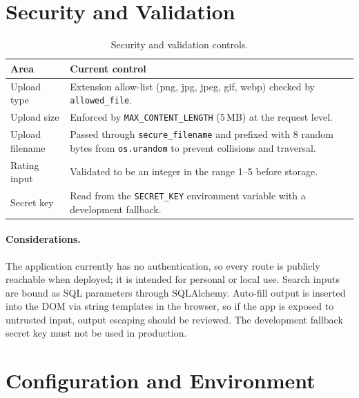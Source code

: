 \documentclass[11pt,a4paper]{article}
\newcommand{\code}[1]{\texttt{#1}}
\begin{document}
\section{Security and Validation}

\begin{table}[h]
\centering
\small
\begin{tabularx}{\textwidth}{@{}lX@{}}
\toprule
\textbf{Area} & \textbf{Current control} \\
\midrule
Upload type      & Extension allow-list (png, jpg, jpeg, gif, webp) checked by \code{allowed\_file}. \\
Upload size      & Enforced by \code{MAX\_CONTENT\_LENGTH} (5\,MB) at the request level. \\
Upload filename  & Passed through \code{secure\_filename} and prefixed with 8 random bytes from \code{os.urandom} to prevent collisions and traversal. \\
Rating input     & Validated to be an integer in the range 1--5 before storage. \\
Secret key       & Read from the \code{SECRET\_KEY} environment variable with a development fallback. \\
\bottomrule
\end{tabularx}
\caption{Security and validation controls.}
\end{table}

\paragraph{Considerations.} The application currently has no authentication, so
every route is publicly reachable when deployed; it is intended for personal or
local use. Search inputs are bound as SQL parameters through SQLAlchemy. Auto-fill
output is inserted into the DOM via string templates in the browser, so if the
app is exposed to untrusted input, output escaping should be reviewed. The
development fallback secret key must not be used in production.

\section{Configuration and Environment}
\end{document}
